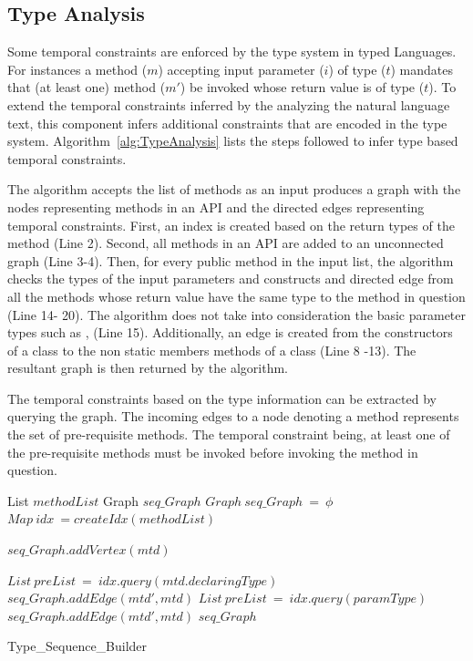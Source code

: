 \subsection{Type Analysis}

Some temporal constraints are enforced by the type system in typed Languages.
For instances a method ($m$) accepting input parameter ($i$) of type ($t$) mandates that (at least one) method ($m'$) be invoked whose return value is of type ($t$).
To extend the temporal constraints inferred by the analyzing the natural language text, this component infers additional constraints that are encoded
in the type system. Algorithm~\ref{alg:TypeAnalysis} lists the steps followed to infer type based temporal constraints.

The algorithm accepts the list of methods as an input produces a graph with
the nodes representing methods in an API and the directed edges representing temporal constraints.
First, an index is created based on the return types of the method (Line 2).
Second, all methods in an API are added to an unconnected graph (Line 3-4).
Then, for every public method in the input list, the algorithm checks the types
of the input parameters and constructs and directed edge from all the methods whose return value
have the same type to the method in question (Line 14- 20).
The algorithm does not take into consideration the basic parameter types such as ,  (Line 15).
Additionally, an edge is created from the constructors of a class to the non static members methods of a class (Line 8 -13).
The resultant graph is then returned by the algorithm.


The temporal constraints based on the type information can be extracted by querying the graph. 
The incoming edges to a node denoting a method represents the set of pre-requisite methods.
The temporal constraint being, at least one of the pre-requisite methods must be invoked before invoking the method in question.


\begin{algorithm}[t!]
\begin{algorithmic}[1]
\begin{scriptsize}
\REQUIRE List $methodList$ 
\ENSURE Graph $seq\_Graph$
\STATE $Graph\ seq\_Graph\ =\ \phi$
\STATE $Map\ idx\ = createIdx(methodList)$

	\STATE $seq\_Graph.addVertex(mtd)$
\ENDFOR

			\STATE $List\ preList\ =\ idx.query(mtd.declaringType)$
				\STATE $seq\_Graph.addEdge(mtd',mtd)$
			\ENDFOR
		\ENDIF
				\STATE $List\ preList\ =\ idx.query(paramType)$
					\STATE $seq\_Graph.addEdge(mtd',mtd)$
				\ENDFOR				
			\ENDIF
		\ENDFOR
	\ENDIF
\ENDFOR
\RETURN $seq\_Graph$
\end{scriptsize}
\end{algorithmic}
\caption{Type\_Sequence\_Builder}
\label{alg:TypeAnalysis}
\end{algorithm} 

